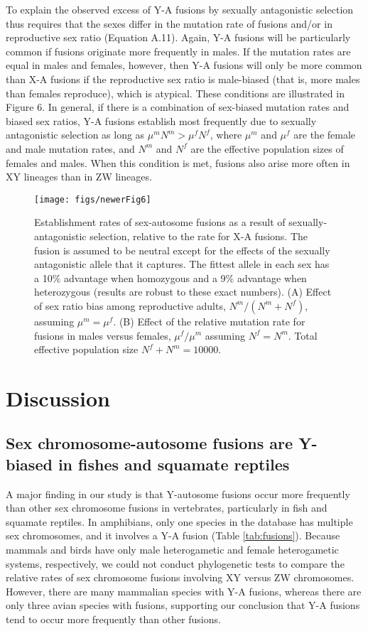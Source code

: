 To explain the observed excess of Y-A fusions by sexually antagonistic selection thus requires that the sexes differ in the mutation rate of fusions and/or in reproductive sex ratio (Equation A.11). Again, Y-A fusions will be particularly common if fusions originate more frequently in males. If the mutation rates are equal in males and females, however, then Y-A fusions will only be more common than X-A fusions if the reproductive sex ratio is male-biased (that is, more males than females reproduce), which is atypical. These conditions are illustrated in Figure 6. In general, if there is a combination of sex-biased mutation rates and biased sex ratios, Y-A fusions establish most frequently due to sexually antagonistic selection as long as $\mu^m N^m > \mu^fN^f$, where $\mu^m$ and $\mu^f$ are the female and male mutation rates, and $N^m$ and $N^f$ are the effective population sizes of females and males. When this condition is met, fusions also arise more often in XY lineages than in ZW lineages.

\begin{figure}
\centering
\texttt{[image: figs/newerFig6]}
\caption[Establishment rates of sex-autosome fusions under SA selection]{Establishment rates of sex-autosome fusions as a result of sexually-antagonistic selection, relative to the rate for X-A fusions. The fusion is assumed to be neutral except for the effects of the sexually antagonistic allele that it captures. The fittest allele in each sex has a 10\% advantage when homozygous and a 9\% advantage when heterozygous (results are robust to these exact numbers). (A) Effect of sex ratio bias among reproductive adults, $N^m/(N^m + N^f)$, assuming $\mu^m=\mu^f$. (B) Effect of the relative mutation rate for fusions in males versus females, $\mu^f/\mu^m$ assuming $N^f=N^m$. Total effective population size $N^f+N^m=\text{10000}$.}
\label{fig:fuse-sa}
\end{figure}

\section{Discussion}

\subsection{Sex chromosome-autosome fusions are Y-biased in fishes and squamate reptiles}

A major finding in our study is that Y-autosome fusions occur more frequently than other sex chromosome fusions in vertebrates, particularly in fish and squamate reptiles. In amphibians, only one species in the database has multiple sex chromosomes, and it involves a Y-A fusion (Table \ref{tab:fusions}). Because mammals and birds have only male heterogametic and female heterogametic systems, respectively, we could not conduct phylogenetic tests to compare the relative rates of sex chromosome fusions involving XY versus ZW chromosomes. However, there are many mammalian species with Y-A fusions, whereas there are only three avian species with fusions, supporting our conclusion that Y-A fusions tend to occur more frequently than other fusions. 

